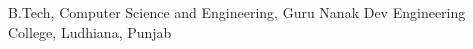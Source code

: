     {B.Tech, }
    {Computer Science and Engineering, }
    {Guru Nanak Dev Engineering College, Ludhiana, Punjab}
    {}
    {}


